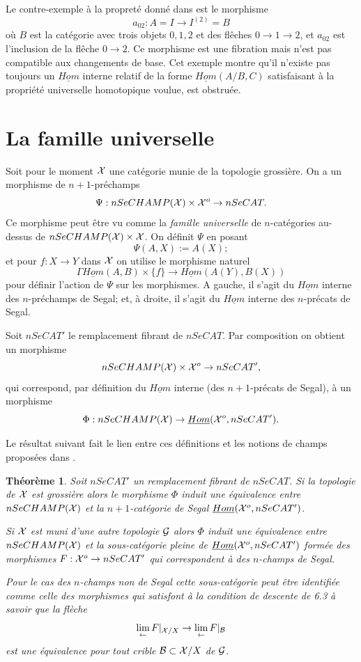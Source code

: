 \documentclass[12pt]{article}
\newcommand{\numero}[1]{\newpage\section{#1}}
\newtheorem{theoreme}[lemma]{Th\'eor\`eme}
\newcommand{\Gg}{{\cal G}}
\newcommand{\Bb}{{\cal B}}
\newcommand{\Xx}{{\cal X}}
\begin{document}
Le contre-exemple \`a la propret\'e donn\'e dans \cite{nCAT} est le
morphisme
$$
a_{02}: A=I\rightarrow I^{(2)}=B
$$
o\`u $B$ est la cat\'egorie avec trois objets $0,1,2$ et des fl\^eches
$0\rightarrow 1\rightarrow 2$, et $a_{02}$ est l'inclusion de la fl\^eche
$0\rightarrow 2$. Ce morphisme est une fibration mais n'est pas compatible aux
changements de base. Cet exemple montre qu'il n'existe pas toujours un
$\underline{Hom}$ interne relatif de la forme $\underline{Hom}(A/B,C)$
satisfaisant \`a la propri\'et\'e universelle homotopique voulue, est
obstru\'ee.



\numero{La famille universelle}

\label{universellepage}

Soit pour le moment $\Xx$ une cat\'egorie munie de la topologie grossi\`ere.
On a un morphisme de $n+1$-pr\'echamps
$$
\Psi : nSeCHAMP(\Xx ) \times \Xx ^o \rightarrow nSeCAT.
$$
Ce morphisme peut \^etre vu comme la {\em famille universelle} de
$n$-cat\'egories
au-dessus de $nSeCHAMP(\Xx ) \times \Xx$. On d\'efinit $\Psi$ en posant
$$
\Psi (A,X):= A(X);
$$
et pour $f:X\rightarrow Y$ dans $\Xx $ on utilise le morphisme naturel
$$
\Gamma \underline{Hom}(A,B) \times \{ f\} \rightarrow \underline{Hom}(A(Y),
B(X))
$$
pour d\'efinir l'action de $\Psi$ sur les morphismes. A gauche,
il s'agit du
$\underline{Hom}$ interne des $n$-pr\'echamps de Segal; et, \`a droite,
il s'agit du
$\underline{Hom}$ interne des $n$-pr\'ecats de Segal.

Soit $nSeCAT'$ le remplacement fibrant de $nSeCAT$. Par composition on
obtient
un morphisme
$$
nSeCHAMP(\Xx ) \times \Xx ^o\rightarrow nSeCAT',
$$
qui correspond, par d\'efinition du $\underline{Hom}$ interne (des
$n+1$-pr\'ecats de Segal), \`a un morphisme
$$
\Phi : nSeCHAMP(\Xx ) \rightarrow \underline{Hom}(\Xx ^o, nSeCAT').
$$

Le r\'esultat suivant fait le
lien entre ces d\'efinitions et les notions de champs propos\'ees dans
\cite{limits}.


\begin{theoreme}
\label{correlation}
Soit $nSeCAT'$ un remplacement fibrant de $nSeCAT$.
Si la topologie de $\Xx$ est
grossi\`ere alors le morphisme
$\Phi$ induit une \'equivalence entre
$nSeCHAMP(\Xx )$ et la
$n+1$-cat\'egorie de Segal $\underline{Hom}(\Xx ^o, nSeCAT')$.

Si $\Xx$ est muni d'une autre topologie
$\Gg$ alors $\Phi$ induit une \'equivalence entre \newline
$nSeCHAMP(\Xx )$ et la sous-cat\'egorie
pleine de
$\underline{Hom}(\Xx ^o, nSeCAT')$ form\'ee des morphismes
$F:\Xx ^o\rightarrow nSeCAT'$ qui correspondent \`a des $n$-champs de Segal.

Pour le cas des $n$-champs non de Segal cette sous-cat\'egorie peut \^etre
identifi\'ee comme celle des morphismes qui 
satisfont \`a la condition de descente
de \cite{limits} 6.3 \`a savoir que la fl\`eche
$$
\lim _{\leftarrow} F|_{\Xx /X} \rightarrow
\lim _{\leftarrow} F|_{\Bb}
$$
est une \'equivalence pour tout crible $\Bb \subset \Xx /X$ de $\Gg$.
\end{theoreme}
\end{document}

